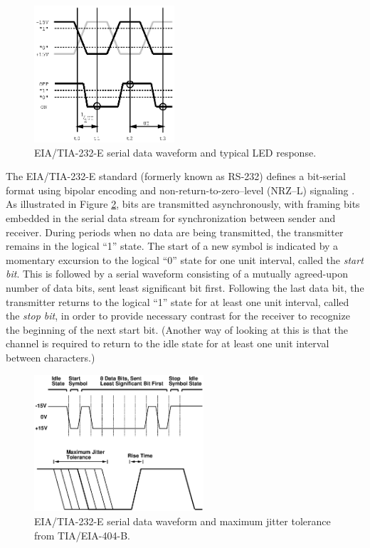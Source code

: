 \documentclass{acmtrans2e}
\begin{document}
\begin{figure}
\centering
\includegraphics[height=2in]{Figure_2.eps}
\caption{EIA/TIA-232-E serial data waveform and typical LED response.}
\label{idealized_led_response_figure}
\end{figure}

The EIA/TIA-232-E standard (formerly known as RS-232) defines a
bit-serial format using bipolar encoding and non-return-to-zero--level 
(NRZ--L) signaling \cite{eia_tia_232_e}.  As illustrated in Figure
\ref{jitter_tolerance_figure}, bits are
transmitted asynchronously, with framing 
bits embedded in the serial data stream for synchronization 
between sender and receiver.  During periods when no data are being 
transmitted, the transmitter remains in the logical ``1'' state.  The 
start of a new symbol is indicated by a momentary excursion to the 
logical ``0'' state for one unit interval, called the {\it start bit}.  
This is followed by a serial waveform consisting of a mutually
agreed-upon number of data bits, sent least significant bit first.  Following 
the last data bit, the transmitter returns to the logical ``1'' state 
for at least one unit interval, called the {\it stop bit}, in order to 
provide necessary contrast for the receiver to recognize the 
beginning of the next start bit.  (Another way of looking at this is that the
channel is required to return to the idle state for at least one unit interval
between characters.)

\begin{figure}
\centering
\includegraphics[height=2in]{Figure_3.eps}
\caption{EIA/TIA-232-E serial data waveform and maximum jitter
tolerance from TIA/EIA-404-B.}
\label{jitter_tolerance_figure}
\end{figure}
\end{document}
